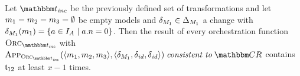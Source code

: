 \begin{lemma}
    \label{lemma:minimal_executions}
    Let $\transformationset{T}_\mathvariable{inc}$ be the previously defined set of transformations and let $\model{m}{1} = \model{m}{2} = \model{m}{3} = \emptyset$ be empty models and $\change{\metamodel{M}{1}} \in \changeuniverse{\metamodel{M}{1}}$ a change with $\change{\metamodel{M}{1}}(\model{m}{1}) = \setted{a \in \instances{\class{A}{}} \mid a.n = 0}$.
    Then the result of every orchestration function $\orcfunction{\transformationset{T}_\mathvariable{inc}}$ with $\appfunction{\orcfunction{\transformationset{T}_\mathvariable{inc}}}(\tupled{\model{m}{1},\model{m}{2},\model{m}{3}},\tupled{\change{\metamodel{M}{1}},\identitychange,\identitychange}) \consistenttomath \consistencyrelationset{CR}$ contains $\transformation{t}_{12}$ at least $x-1$ times.
\end{lemma}
